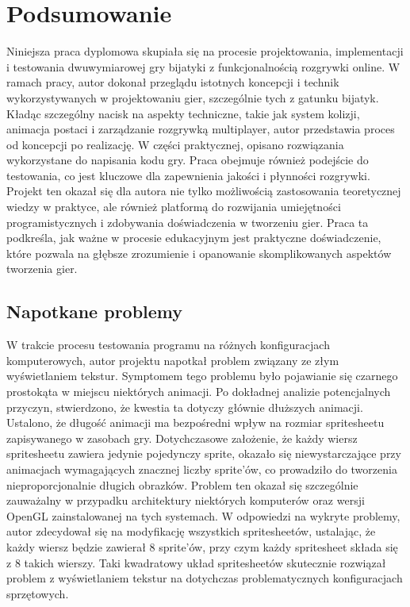 \chapter{Podsumowanie}
Niniejsza praca dyplomowa skupiała się na procesie projektowania, implementacji i testowania dwuwymiarowej gry bijatyki z funkcjonalnością rozgrywki online. W ramach pracy, autor dokonał przeglądu istotnych koncepcji i technik wykorzystywanych w projektowaniu gier, szczególnie tych z gatunku bijatyk. Kładąc szczególny nacisk na aspekty techniczne, takie jak system kolizji, animacja postaci i zarządzanie rozgrywką multiplayer, autor przedstawia proces od koncepcji po realizację. W części praktycznej, opisano rozwiązania wykorzystane do napisania kodu gry. Praca obejmuje również podejście do testowania, co jest kluczowe dla zapewnienia jakości i płynności rozgrywki. Projekt ten okazał się dla autora nie tylko możliwością zastosowania teoretycznej wiedzy w praktyce, ale również platformą do rozwijania umiejętności programistycznych i zdobywania doświadczenia w tworzeniu gier. Praca ta podkreśla, jak ważne w procesie edukacyjnym jest praktyczne doświadczenie, które pozwala na głębsze zrozumienie i opanowanie skomplikowanych aspektów tworzenia gier.

\section{Napotkane problemy}
W trakcie procesu testowania programu na różnych konfiguracjach komputerowych, autor projektu napotkał problem związany ze złym wyświetlaniem tekstur. Symptomem tego problemu było pojawianie się czarnego prostokąta w miejscu niektórych animacji. Po dokładnej analizie potencjalnych przyczyn, stwierdzono, że kwestia ta dotyczy głównie dłuższych animacji. Ustalono, że długość animacji ma bezpośredni wpływ na rozmiar spritesheetu zapisywanego w zasobach gry. Dotychczasowe założenie, że każdy wiersz spritesheetu zawiera jedynie pojedynczy sprite, okazało się niewystarczające przy animacjach wymagających znacznej liczby sprite'ów, co prowadziło do tworzenia nieproporcjonalnie długich obrazków. Problem ten okazał się szczególnie zauważalny w przypadku architektury niektórych komputerów oraz wersji OpenGL zainstalowanej na tych systemach. W odpowiedzi na wykryte problemy, autor zdecydował się na modyfikację wszystkich spritesheetów, ustalając, że każdy wiersz będzie zawierał 8 sprite'ów, przy czym każdy spritesheet składa się z 8 takich wierszy. Taki kwadratowy układ spritesheetów skutecznie rozwiązał problem z wyświetlaniem tekstur na dotychczas problematycznych konfiguracjach sprzętowych.

